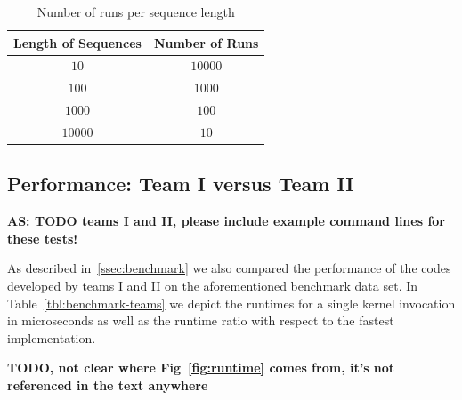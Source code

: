 \documentclass[runningheads,a4paper]{llncs}
\begin{document}
\begin{table}
\centering

\begin{tabular}{|c|c|}
\hline
Length of Sequences & Number of Runs \\
\hline
$10$ & $10000$ \\
\hline
$100$ & $1000$ \\
\hline
$1000$ & $100$ \\
\hline
$10000$ & $10$ \\
\hline
\end{tabular}
\caption{Number of runs per sequence length}
\label{fig:runs}
\end{table}

\subsection{Performance: Team I versus Team II}
\label{team-contest}

{\bf AS: TODO teams I and II, please include example command lines for these tests!} 

As described in~\ref{ssec:benchmark} we also compared the performance of the codes developed by teams I and II 
on the aforementioned benchmark data set. In Table~\ref{tbl:benchmark-teams} we depict the runtimes for a single kernel invocation 
in microseconds  as well as the runtime ratio with respect to the fastest implementation. 

{\bf TODO, not clear where Fig~\ref{fig:runtime} comes from, it's not referenced in the text anywhere}
\end{document}
